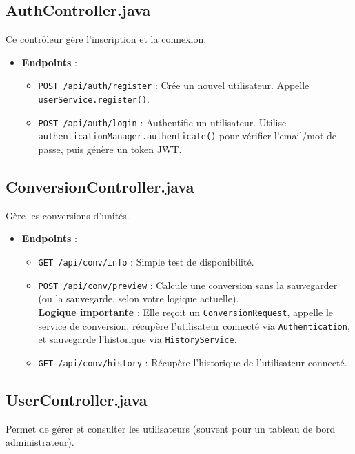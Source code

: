 \documentclass{article}
\begin{document}
\subsection{AuthController.java}
Ce contrôleur gère l'inscription et la connexion.

\begin{itemize}
    \item \textbf{Endpoints} :
    \begin{itemize}
        \item \texttt{POST /api/auth/register} : Crée un nouvel utilisateur. Appelle \texttt{userService.register()}.
        \item \texttt{POST /api/auth/login} : Authentifie un utilisateur. Utilise \texttt{authenticationManager.authenticate()} pour vérifier l'email/mot de passe, puis génère un token JWT.
    \end{itemize}
\end{itemize}

\subsection{ConversionController.java}
Gère les conversions d'unités.

\begin{itemize}
    \item \textbf{Endpoints} :
    \begin{itemize}
        \item \texttt{GET /api/conv/info} : Simple test de disponibilité.
        \item \texttt{POST /api/conv/preview} : Calcule une conversion sans la sauvegarder (ou la sauvegarde, selon votre logique actuelle).
        \\ \textbf{Logique importante} : Elle reçoit un \texttt{ConversionRequest}, appelle le service de conversion, récupère l'utilisateur connecté via \texttt{Authentication}, et sauvegarde l'historique via \texttt{HistoryService}.
        \item \texttt{GET /api/conv/history} : Récupère l'historique de l'utilisateur connecté.
    \end{itemize}
\end{itemize}

\subsection{UserController.java}
Permet de gérer et consulter les utilisateurs (souvent pour un tableau de bord administrateur).
\end{document}
